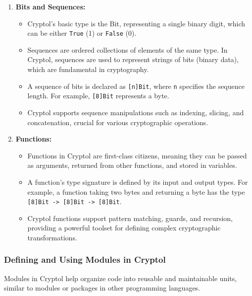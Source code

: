 \begin{enumerate}
	\item \textbf{Bits and Sequences:}
	\begin{itemize}
		\item Cryptol's basic type is the Bit, representing a single binary digit, which can be either \texttt{True} (1) or \texttt{False} (0).
		\item Sequences are ordered collections of elements of the same type. In Cryptol, sequences are used to represent strings of bits (binary data), which are fundamental in cryptography.
		\item A sequence of bits is declared as \texttt{[n]Bit}, where \texttt{n} specifies the sequence length. For example, \texttt{[8]Bit} represents a byte.
		\item Cryptol supports sequence manipulations such as indexing, slicing, and concatenation, crucial for various cryptographic operations.
	\end{itemize}
	
	\item \textbf{Functions:}
	\begin{itemize}
		\item Functions in Cryptol are first-class citizens, meaning they can be passed as arguments, returned from other functions, and stored in variables.
		\item A function's type signature is defined by its input and output types. For example, a function taking two bytes and returning a byte has the type \texttt{[8]Bit -> [8]Bit -> [8]Bit}.
		\item Cryptol functions support pattern matching, guards, and recursion, providing a powerful toolset for defining complex cryptographic transformations.
	\end{itemize}
\end{enumerate}

\subsubsection{Defining and Using Modules in Cryptol}
Modules in Cryptol help organize code into reusable and maintainable units, similar to modules or packages in other programming languages.

